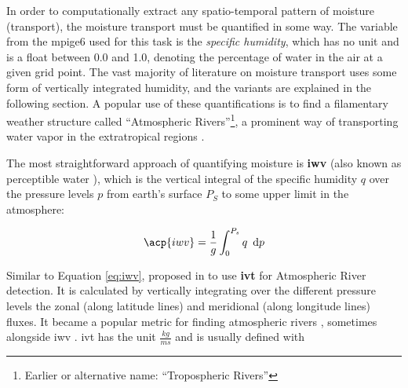 In order to computationally extract any spatio-temporal pattern of moisture (transport), the moisture transport must be quantified in some way.
The variable from the \ac{mpige6} used for this task is the \textit{specific humidity}, which has no unit and is a float between 0.0 and 1.0, denoting the percentage of water in the air at a given grid point. 
The vast majority of literature on moisture transport uses some form of vertically integrated humidity, and the variants are explained in the following section.  
A popular use of these quantifications is to find a filamentary weather structure called \enquote{Atmospheric Rivers}\footnote{Earlier or alternative name: \enquote{Tropospheric Rivers}}, a prominent way of transporting water vapor in the extratropical regions \cite{gimeno_atmospheric_2014}. 


The most straightforward approach of quantifying moisture is \textbf{\ac{iwv}} \cite{gimeno_atmospheric_2014, schluessel_atmospheric_1990, bao_interpretation_2006, neiman_meteorological_2008, zhao_lagrangian_2021, wypych_atmospheric_2018}(also known as perceptible water \cite{wypych_atmospheric_2018}), which is the vertical integral of the specific humidity $q$ over the pressure levels $p$ from earth's surface $P_S$ to some upper limit in the atmosphere:


\begin{equation}
\label{eq:iwv}
\acp{iwv} = \frac{1}{g} \int^{P_s}_0 q ~\diff p
\end{equation}






Similar to Equation \ref{eq:iwv},  \citeauthor{zhu_proposed_1998} proposed in \cite{zhu_proposed_1998} to use \textbf{\ac{ivt}} for Atmospheric River detection. 
It is calculated by vertically integrating over the different pressure levels the zonal (along latitude lines) and meridional (along longitude lines) fluxes.
It became a popular metric for finding atmospheric rivers \cite{gimeno_atmospheric_2014}, sometimes alongside \ac{iwv} \cite{eiras-barca_seasonal_2016}.
\ac{ivt} has the unit $\frac{kg}{ms}$ and is usually defined with

